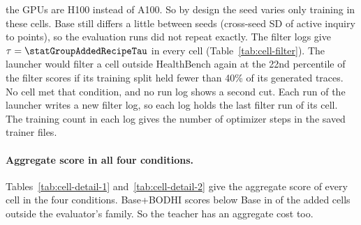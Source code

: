 \documentclass{article}
\newcommand{\bodhi}{BODHI}
\begin{document}
the GPUs are H100 instead of A100. So by design the seed varies only training in these cells.
Base still differs a little between seeds (cross-seed SD of active inquiry
\statGroupAddedBaseActiveInquirySDMin{} to \statGroupAddedBaseActiveInquirySDMax{} points), so the evaluation runs did
not repeat exactly. The filter
logs give $\tau = \statGroupAddedRecipeTau$ in every cell (Table~\ref{tab:cell-filter}). The launcher would
filter a cell outside HealthBench again at the 22nd percentile of the filter scores if its
training split held fewer than 40\% of its generated traces. No cell met that condition, and no
run log shows a second cut. Each run of the launcher writes a new filter log, so each log holds
the last filter run of its cell. The training count in each log gives the number of optimizer
steps in the saved trainer files.

\begin{table}[!ht]
\centering
\small
\caption{Filter and training per added cell, from the filter logs and the saved trainer files.
$\tau$: filter threshold. Graded: traces that the filter grader scored. Kept: share of graded
traces with $s \geq \tau$. Train and Val: the split of the kept traces, one per cell. Steps:
optimizer steps, the same in every seed. Epoch: epoch of the evaluated checkpoint (lowest
validation loss) over the five seeds. $^{\dagger}$Base model in the evaluator's family.
$^{\ddagger}$Set aside (\S\ref{sec:cells}).}
\label{tab:cell-filter}
\setlength{\tabcolsep}{4pt}

\end{table}

\paragraph{Aggregate score in all four conditions.} Tables~\ref{tab:cell-detail-1}
and~\ref{tab:cell-detail-2} give the aggregate score of every cell in the four conditions.
Base+\bodhi{} scores below Base in \statGroupAddedOutsideFamilyRubricScoreBaseProtocolvsBaseDown{} of the
\statGroupAddedOutsideFamilyRubricScoreLoRAvsBaseMeasured{} added cells outside the evaluator's family. So the teacher has an
aggregate cost too.
\end{document}
